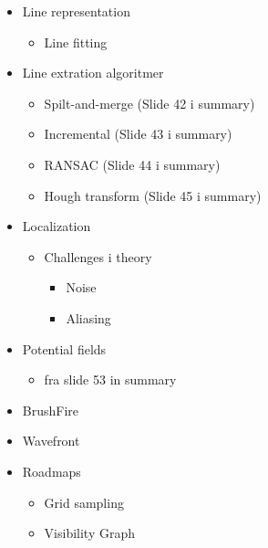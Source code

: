 \documentclass[a4paper,11pt]{article}
\begin{document}
    \begin{itemize}
        \item Line representation
            \begin{itemize}
                \item Line fitting
            \end{itemize}
        \item Line extration algoritmer
            \begin{itemize}
                \item Spilt-and-merge (Slide 42 i summary)
                \item Incremental (Slide 43 i summary)
                \item RANSAC (Slide 44 i summary)
                \item Hough transform (Slide 45 i summary)
            \end{itemize}
        \item Localization
            \begin{itemize}
                \item Challenges i theory
                    \begin{itemize}
                        \item Noise
                        \item Aliasing
                    \end{itemize}
            \end{itemize}
        \item Potential fields
            \begin{itemize}
                \item fra slide 53 in summary 
            \end{itemize}
        \item BrushFire
        \item Wavefront
        \item Roadmaps
            \begin{itemize}
                \begin{itemize}
                    \item Accessibility (Slide 77, summary)
                    \item Departability (Slide 77, summary)
                    \item Connectivity  (Slide 77, summary)
                \end{itemize}
            \item Grid sampling
            \item Visibility Graph

\end{itemize}
\end{itemize}
\end{document}
